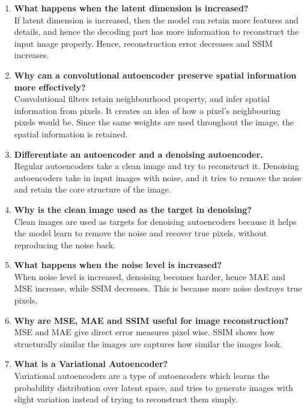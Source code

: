 \documentclass[10pt]{article}
\begin{document}
\begin{enumerate}
\item \textbf{What happens when the latent dimension is increased?}\\
If latent dimension is increased, then the model can retain more features and details, and hence the decoding part has more information to reconstruct the input image properly. Hence, reconstruction error decreases and SSIM increases.\\

\item \textbf{Why can a convolutional autoencoder preserve spatial information more effectively?}\\
Convolutional filters retain neighbourhood property, and infer spatial information from pixels. It creates an idea of how a pixel's neighbouring pixels would be. Since the same weights are used throughout the image, the spatial information is retained.\\

\item \textbf{Differentiate an autoencoder and a denoising autoencoder.}\\
Regular autoencoders take a clean image and try to reconstruct it. Denoising autoencoders take in input images with noise, and it tries to remove the noise and retain the core structure of the image.\\

\item \textbf{Why is the clean image used as the target in denoising?}\\
Clean images are used as targets for denoising autoencoders because it helps the model learn to remove the noise and recover true pixels, without reproducing the noise back.\\

\item \textbf{What happens when the noise level is increased?}\\
When noise level is increased, denoising becomes harder, hence MAE and MSE increase, while SSIM decreases. This is because more noise destroys true pixels.\\

\item \textbf{Why are MSE, MAE and SSIM useful for image reconstruction?}\\
MSE and MAE give direct error measures pixel wise. SSIM shows how structurally similar the images are captures how similar the images look.\\

\item \textbf{What is a Variational Autoencoder?}\\
Variational autoencoders are a type of autoencoders which learns the probability distribution over latent space, and tries to generate images with slight variation instead of trying to reconstruct them simply.\\


\end{enumerate}
\end{document}
